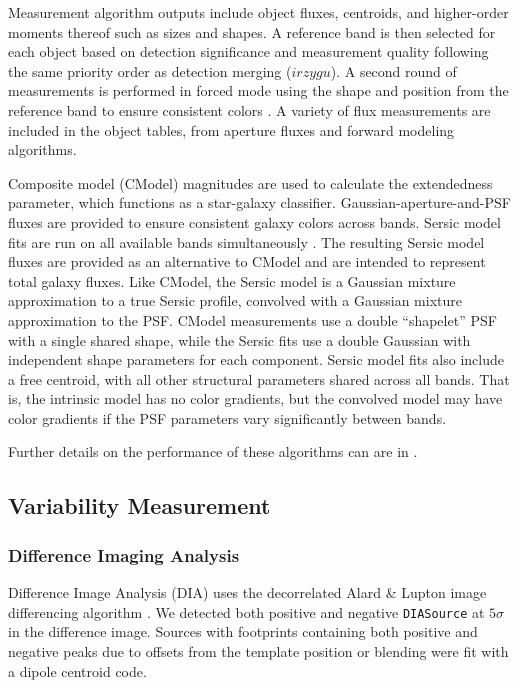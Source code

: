 Measurement \gls{algorithm} outputs include object fluxes, centroids, and higher-order moments thereof such as sizes and shapes.
A reference band is then selected for each object based on detection significance and measurement quality following the same priority order as detection merging ($irzygu$).
A second round of measurements is performed in forced mode using the shape and position from the reference band to ensure consistent colors \citep{2018PASJ...70S...5B}.
A variety of \gls{flux} measurements are included in the object tables, from aperture fluxes and forward modeling algorithms.

Composite model (CModel) magnitudes \citep{2004AJ....128..502A, 2018PASJ...70S...5B} are used to calculate the extendedness parameter, which functions as a star-galaxy classifier.
Gaussian-aperture-and-PSF \citep[GAaP][]{2008A&A...482.1053K, DMTN-190} fluxes are provided to ensure consistent galaxy colors across bands.
Sersic model \citep{1963BAAA....6...41S, 1968adga.book.....S} fits are run on all available bands simultaneously \cite[MultiProFit,][]{dmtn-312}.
The resulting Sersic model fluxes are provided as an alternative to CModel and are intended to represent total galaxy fluxes.
Like CModel, the Sersic model is a Gaussian mixture approximation to a true Sersic profile, convolved with a Gaussian mixture approximation to the \gls{PSF}.
CModel measurements use a double ``shapelet'' \citep{2003ARA&A..41..645R} PSF with a single shared shape, while the Sersic fits use a double Gaussian with independent shape parameters for each component.
Sersic model fits also include a free centroid, with all other structural parameters shared across all bands.
That is, the intrinsic model has no color gradients, but the convolved model may have color gradients if the \gls{PSF} parameters vary significantly between bands.

Further details on the performance of these algorithms can are in .

\subsection{Variability Measurement}

\subsubsection{Difference Imaging Analysis
\label{ssec:difim_analysis}}
Difference Image Analysis (DIA) uses the decorrelated Alard \& Lupton image differencing algorithm \citep{DMTN-021}.
We detected both positive and negative \texttt{DIASource} at $5\sigma$ in the difference image.
Sources with footprints containing both positive and negative peaks due to offsets from the template position or blending were fit with a dipole centroid code.

